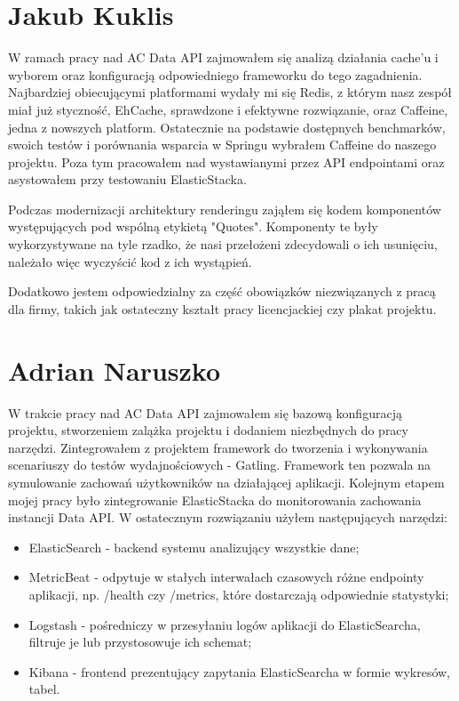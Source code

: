 \documentclass[licencjacka]{pracamgr}
\begin{document}
\vspace{3mm}

\section{Jakub Kuklis}

W ramach pracy nad AC Data API zajmowałem się analizą działania cache'u i wyborem oraz konfiguracją odpowiedniego frameworku do tego zagadnienia. Najbardziej obiecującymi platformami wydały mi się Redis, z którym nasz zespół miał już styczność, EhCache, sprawdzone i efektywne rozwiązanie, oraz Caffeine, jedna z nowszych platform. Ostatecznie na podstawie dostępnych benchmarków, swoich testów i porównania wsparcia w Springu wybrałem Caffeine do naszego projektu. Poza tym pracowałem nad wystawianymi przez API endpointami oraz asystowałem przy testowaniu ElasticStacka.

\vspace{1mm}

Podczas modernizacji architektury renderingu zająłem się kodem komponentów występujących pod wspólną etykietą "Quotes". Komponenty te były wykorzystywane na tyle rzadko, że nasi przełożeni zdecydowali o ich usunięciu, należało więc wyczyścić kod z ich wystąpień.

\vspace{1mm}

Dodatkowo jestem odpowiedzialny za część obowiązków niezwiązanych z pracą dla firmy, takich jak ostateczny kształt pracy licencjackiej czy plakat projektu.

\section{Adrian Naruszko}

W trakcie pracy nad AC Data API zajmowałem się bazową konfiguracją projektu, stworzeniem zalążka projektu i dodaniem niezbędnych do pracy narzędzi. 
Zintegrowałem z projektem framework do tworzenia i wykonywania scenariuszy do testów wydajnościowych - Gatling. 
Framework ten pozwala na symulowanie zachowań użytkowników na działającej aplikacji.
Kolejnym etapem mojej pracy było zintegrowanie ElasticStacka do monitorowania zachowania instancji Data API. W ostatecznym rozwiązaniu użyłem następujących narzędzi:
\begin{itemize}
\item ElasticSearch - backend systemu analizujący wszystkie dane;
\item MetricBeat - odpytuje w stałych interwałach czasowych różne endpointy aplikacji, np. /health czy /metrics, które dostarczają odpowiednie statystyki;
\item Logstash - pośredniczy w przesyłaniu logów aplikacji do ElasticSearcha, filtruje je lub przystosowuje ich schemat;
\item Kibana - frontend prezentujący zapytania ElasticSearcha w formie wykresów, tabel.
\end{itemize}
\end{document}
